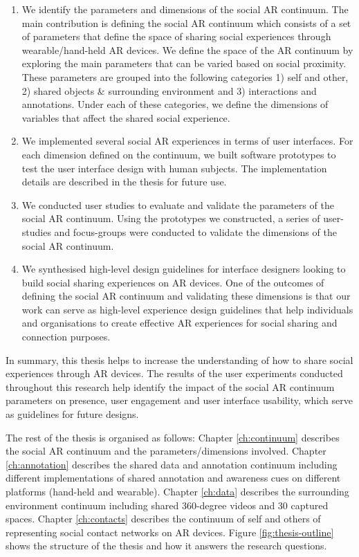 \begin{enumerate}
    \item We identify the parameters and dimensions of the social AR continuum. The main contribution is defining the social AR continuum which consists of a set of parameters that define the space of sharing social experiences through wearable/hand-held AR devices. We define the space of the AR continuum by exploring the main parameters that can be varied based on social proximity. These parameters are grouped into the following categories 1) self and other, 2) shared objects \& surrounding environment and 3) interactions and annotations. Under each of these categories, we define the dimensions of variables that affect the shared social experience.
    
    \item We implemented several social AR experiences in terms of user interfaces. For each dimension defined on the continuum, we built software prototypes to test the user interface design with human subjects. The implementation details are described in the thesis for future use.
    
    \item We conducted user studies to evaluate and validate the parameters of the social AR continuum. Using the prototypes we constructed, a series of user-studies and focus-groups were conducted to validate the dimensions of the social AR continuum.
    
    \item We synthesised high-level design guidelines for interface designers looking to build social sharing experiences on AR devices. One of the outcomes of defining the social AR continuum and validating these dimensions is that our work can serve as high-level experience design guidelines that help individuals and organisations to create effective AR experiences for social sharing and connection purposes.
\end{enumerate}

In summary, this thesis helps to increase the understanding of how to share social experiences through AR devices. The results of the user experiments conducted throughout this research help identify the impact of the social AR continuum parameters on presence, user engagement and user interface usability, which serve as guidelines for future designs. 

The rest of the thesis is organised as follows: Chapter \ref{ch:continuum} describes the social AR continuum and the parameters/dimensions involved. Chapter \ref{ch:annotation} describes the shared data and annotation continuum including different implementations of shared annotation and awareness cues on different platforms (hand-held and wearable). Chapter \ref{ch:data} describes the surrounding environment continuum including shared 360-degree videos and 30 captured spaces. Chapter \ref{ch:contacts} describes the continuum of self and others of representing social contact networks on AR devices. Figure \ref{fig:thesis-outline} shows the structure of the thesis and how it answers the research questions. 

